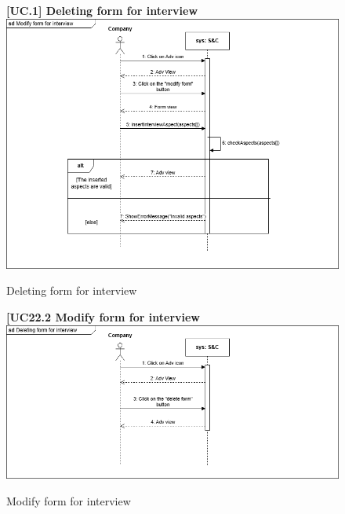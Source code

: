 \begin{figure}[H]
\textbf{[UC\nextUCDiagr.1] Deleting form for interview}\newline\newline
    \includegraphics[width=15cm]{Images/UC_diagram/RASD-UC22.drawio.png}
    \caption{Deleting form for interview}
\end{figure}

\begin{figure}[H]
\textbf{[UC22.2 Modify form for interview}\newline\newline
    \includegraphics[width=15cm]{Images/UC_diagram/RASD-UC23.drawio.png}
    \caption{Modify form for interview}
\end{figure}

